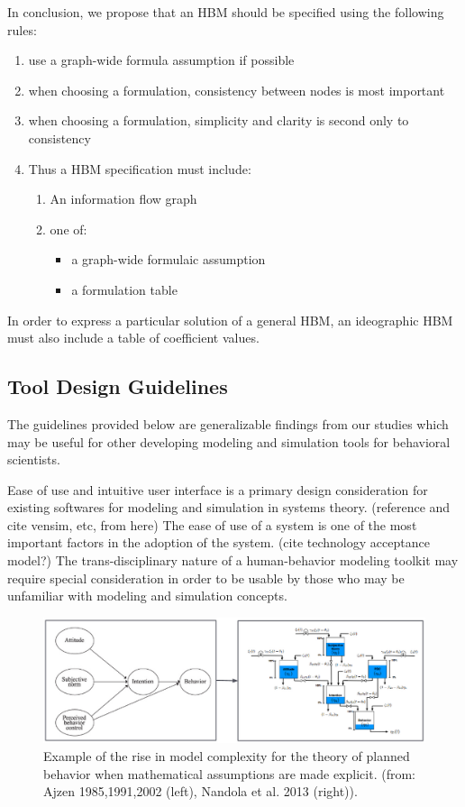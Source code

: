 \documentclass[conference]{IEEEtran}
\begin{document}
In conclusion, we propose that an HBM should be specified using the following rules:

\begin{enumerate}
  \item use a graph-wide formula assumption if possible
  \item when choosing a formulation, consistency between nodes is most important
  \item when choosing a formulation, simplicity and clarity is second only to consistency
  \item Thus a HBM specification must include:
  \begin{enumerate}
   \item An information flow graph
   \item one of:
    \begin{itemize}
      \item a graph-wide formulaic assumption
      \item a formulation table 
    \end{itemize}
  \end{enumerate}
\end{enumerate}

In order to express a particular solution of a general HBM, an ideographic HBM must also include a table of coefficient values. 

\subsection{Tool Design Guidelines}

The guidelines provided below are generalizable findings from our studies which may be useful for other developing modeling and simulation tools for behavioral scientists.


Ease of use and intuitive user interface is a primary design consideration for existing softwares for modeling and simulation in systems theory. (reference and cite vensim, etc, from here) 
The ease of use of a system is one of the most important factors in the adoption of the system. (cite technology acceptance model?) 
The trans-disciplinary nature of a human-behavior modeling toolkit may require special consideration in order to be usable by those who may be unfamiliar with modeling and simulation concepts.

\begin{figure}[!t]
  \centering
  \includegraphics[width=0.9\columnwidth]{img/path2flow}  
  \caption{Example of the rise in model complexity for the theory of planned behavior when mathematical assumptions are made explicit. (from: Ajzen 1985,1991,2002 (left), Nandola et al. 2013 (right)).}
  \label{path2flow}
\end{figure}
\end{document}
